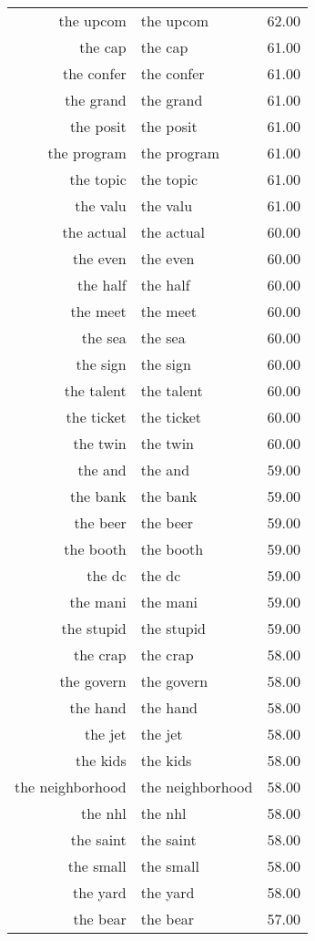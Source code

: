 \begin{table}[ht]
\begin{tabular}{rlr}
  the upcom & the upcom & 62.00 \\ 
  the cap & the cap & 61.00 \\ 
  the confer & the confer & 61.00 \\ 
  the grand & the grand & 61.00 \\ 
  the posit & the posit & 61.00 \\ 
  the program & the program & 61.00 \\ 
  the topic & the topic & 61.00 \\ 
  the valu & the valu & 61.00 \\ 
  the actual & the actual & 60.00 \\ 
  the even & the even & 60.00 \\ 
  the half & the half & 60.00 \\ 
  the meet & the meet & 60.00 \\ 
  the sea & the sea & 60.00 \\ 
  the sign & the sign & 60.00 \\ 
  the talent & the talent & 60.00 \\ 
  the ticket & the ticket & 60.00 \\ 
  the twin & the twin & 60.00 \\ 
  the and & the and & 59.00 \\ 
  the bank & the bank & 59.00 \\ 
  the beer & the beer & 59.00 \\ 
  the booth & the booth & 59.00 \\ 
  the dc & the dc & 59.00 \\ 
  the mani & the mani & 59.00 \\ 
  the stupid & the stupid & 59.00 \\ 
  the crap & the crap & 58.00 \\ 
  the govern & the govern & 58.00 \\ 
  the hand & the hand & 58.00 \\ 
  the jet & the jet & 58.00 \\ 
  the kids & the kids & 58.00 \\ 
  the neighborhood & the neighborhood & 58.00 \\ 
  the nhl & the nhl & 58.00 \\ 
  the saint & the saint & 58.00 \\ 
  the small & the small & 58.00 \\ 
  the yard & the yard & 58.00 \\ 
  the bear & the bear & 57.00 \\ 

\end{tabular}
\end{table}
